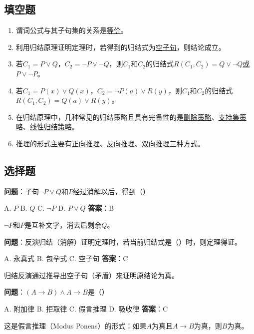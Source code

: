 \subsection{填空题}

\begin{enumerate}[leftmargin=2em,itemsep=2pt]
    \item 谓词公式与其子句集的关系是\underline{等价}。
    \item 利用归结原理证明定理时，若得到的归结式为\underline{空子句}，则结论成立。
    \item 若$C_1 = P \lor Q$，$C_2 = \neg P \lor \neg Q$，则$C_1$和$C_2$的归结式$R(C_1, C_2) = $\underline{$Q \lor \neg Q$或$P \lor \neg P$}。
    \item 若$C_1 = P(x) \lor Q(x)$，$C_2 = \neg P(a) \lor R(y)$，则$C_1$和$C_2$的归结式$R(C_1, C_2) = $\underline{$Q(a) \lor R(y)$}。
    \item 在归结原理中，几种常见的归结策略且具有完备性的是\underline{删除策略}、\underline{支持集策略}、\underline{线性归结策略}。
    \item 推理的形式主要有\underline{正向推理}、\underline{反向推理}、\underline{双向推理}三种方式。
\end{enumerate}

\subsection{选择题}

\begin{examplebox}[选择题3.1]
\textbf{问题}：子句$\neg P \lor Q$和$P$经过消解以后，得到（\quad）

A. $P$ \quad B. $Q$ \quad C. $\neg P$ \quad D. $P \lor Q$
\tcblower
\textbf{答案}：B

$\neg P$和$P$是互补文字，消去后剩余$Q$。
\end{examplebox}

\begin{examplebox}[选择题3.2]
\textbf{问题}：反演归结（消解）证明定理时，若当前归结式是（\quad）时，则定理得证。

A. 永真式 \quad B. 包孕式 \quad C. 空子句
\tcblower
\textbf{答案}：C

归结反演通过推导出空子句（矛盾）来证明原结论为真。
\end{examplebox}

\begin{examplebox}[选择题3.3]
\textbf{问题}：$(A \to B) \land A \to B$是（\quad）

A. 附加律 \quad B. 拒取律 \quad C. 假言推理 \quad D. 吸收律
\tcblower
\textbf{答案}：C

这是假言推理（Modus Ponens）的形式：如果$A$为真且$A \to B$为真，则$B$为真。
\end{examplebox}

